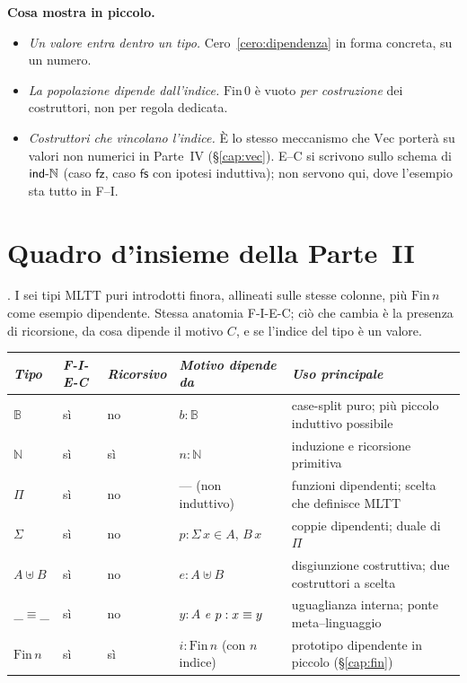\bigskip

\noindent\textbf{Cosa mostra in piccolo.}
\begin{itemize}
\item \emph{Un valore entra dentro un tipo.} Cero~\ref{cero:dipendenza} in forma concreta, su un numero.
\item \emph{La popolazione dipende dall'indice.} $\mathrm{Fin}\,0$ \`e vuoto \emph{per costruzione} dei costruttori, non per regola dedicata.
\item \emph{Costruttori che vincolano l'indice.} \`E lo stesso meccanismo che $\mathrm{Vec}$ porter\`a su valori non numerici in Parte~IV (\S\ref{cap:vec}). E--C si scrivono sullo schema di $\mathsf{ind\text{-}\mathbb{N}}$ (caso $\mathsf{fz}$, caso $\mathsf{fs}$ con ipotesi induttiva); non servono qui, dove l'esempio sta tutto in F--I.
\end{itemize}

\chapter{Quadro d'insieme della Parte~II}\label{cap:quadro-ii}

. I sei tipi MLTT puri introdotti finora, allineati sulle stesse colonne, pi\`u $\mathrm{Fin}\,n$ come esempio dipendente. Stessa anatomia F-I-E-C; ci\`o che cambia \`e la presenza di ricorsione, da cosa dipende il motivo $C$, e se l'indice del tipo \`e un valore.

\bigskip

\begin{center}
\renewcommand{\arraystretch}{1.25}
\small
\begin{tabular}{llllp{4.6cm}}
\toprule
\textit{Tipo} & \textit{F-I-E-C} & \textit{Ricorsivo} & \textit{Motivo dipende da} & \textit{Uso principale} \\
\midrule
$\mathbb{B}$ & s\`i & no & $b : \mathbb{B}$ & case-split puro; pi\`u piccolo induttivo possibile \\
$\mathbb{N}$ & s\`i & s\`i & $n : \mathbb{N}$ & induzione e ricorsione primitiva \\
$\Pi$        & s\`i & no & --- (non induttivo) & funzioni dipendenti; scelta che definisce MLTT \\
$\Sigma$     & s\`i & no & $p : \Sigma\,x\!\in\!A,\,B\,x$ & coppie dipendenti; duale di $\Pi$ \\
$A \uplus B$ & s\`i & no & $e : A \uplus B$ & disgiunzione costruttiva; due costruttori a scelta \\
$\_\equiv\_$ & s\`i & no & $y : A$ \emph{e} $p : x \equiv y$ & uguaglianza interna; ponte meta--linguaggio \\
\midrule
$\mathrm{Fin}\,n$ & s\`i & s\`i & $i : \mathrm{Fin}\,n$ (con $n$ indice) & prototipo dipendente in piccolo (\S\ref{cap:fin}) \\
\bottomrule
\end{tabular}
\end{center}

